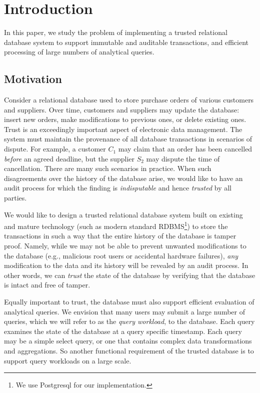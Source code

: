\section{Introduction}

In this paper, we study the problem of implementing a trusted relational
database system to support immutable and auditable transactions, and efficient
processing of large numbers of analytical queries.

\subsection{Motivation}

Consider a relational database
used to store purchase orders of various customers and suppliers.  Over time,
customers and suppliers may update the database: insert new orders, 
make modifications to previous ones, or delete existing ones.  Trust is an
exceedingly important aspect of electronic data management. The system must
maintain the provenance of all database transactions in scenarios of dispute.
For example, a customer $C_1$ may claim that an order has been cancelled {\em
before} an agreed deadline, but the
supplier $S_2$ may dispute the time of cancellation.  There are many such
scenarios in practice.
When such disagreements over the history
of the database arise, we would like to have an audit process for which the
finding is {\em indisputable} and hence {\em trusted} by all parties.

We would like to design a trusted relational database system built on existing
and mature technology (such as modern standard RDBMS\footnote{We use Postgresql
for our implementation.}) to store the transactions in such a way that the entire history
of the database is tamper proof.  Namely, while we may not be able to prevent
unwanted modifications to the database (e.g., malicious root users 
or accidental hardware failures), {\em any} modification to the data and its history will be
revealed by an audit process.  In other words, we can {\em trust} the
state of the database by verifying that the database is intact and free of tamper.

Equally important to trust, the database must also support efficient evaluation
of analytical queries.  We envision that many users may submit a large number of
queries, which we will refer to as the {\em query workload}, to the database.  Each
query examines the state of the database at a query specific timestamp.  
Each query may be a simple select query, or one that contains complex data
transformations and aggregations.  So another
functional requirement of the trusted database is to support 
query workloads on a large scale.

